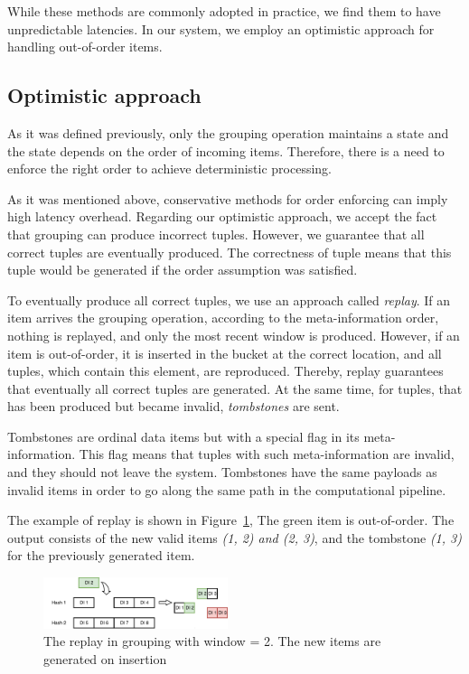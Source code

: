 While these methods are commonly adopted in practice, we find them to have unpredictable latencies. In our system, we employ an optimistic approach for handling out-of-order items.

\subsection{Optimistic approach}

As it was defined previously, only the grouping operation maintains a state and the state depends on the order of incoming items. Therefore, there is a need to enforce the right order to achieve deterministic processing.

As it was mentioned above, conservative methods for order enforcing can imply high latency overhead. Regarding our optimistic approach, we accept the fact that grouping can produce incorrect tuples. However, we guarantee that all correct tuples are eventually produced. The correctness of tuple means that this tuple would be generated if the order assumption was satisfied.

To eventually produce all correct tuples, we use an approach called {\it replay}. If an item arrives the grouping operation, according to the meta-information order, nothing is replayed, and only the most recent window is produced. However, if an item is out-of-order, it is inserted in the bucket at the correct location, and all tuples, which contain this element, are reproduced. Thereby, replay guarantees that eventually all correct tuples are generated. At the same time, for tuples, that has been produced but became invalid, {\it tombstones} are sent.

Tombstones are ordinal data items but with a special flag in its meta-information. This flag means that tuples with such meta-information are invalid, and they should not leave the system. Tombstones have the same payloads as invalid items in order to go along the same path in the computational pipeline.

The example of replay is shown in Figure~\ref{grouping-replaying}, The green item is out-of-order. The output consists of the new valid items {\it (1, 2) and (2, 3)}, and the tombstone {\it (1, 3)} for the previously generated item.

\begin{figure}[htbp]
  \centering
  \includegraphics[width=0.48\textwidth]{pics/grouping-replaying}
  \caption{The replay in grouping with window = 2. The new items are generated on insertion}
  \label {grouping-replaying}
\end{figure}

